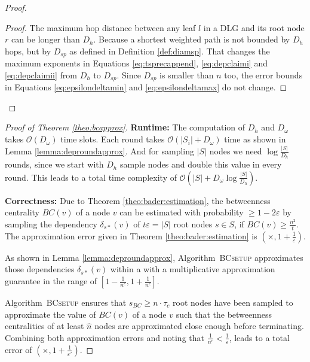 \documentclass[11pt]{article}
\newcommand{\BO}{\mathcal{O}}
\renewcommand{\epsilon}{\varepsilon}
\newif\iffull
\begin{document}
\begin{proof}
\begin{proof}
The maximum hop distance between any leaf $l$ in a DLG and its root node $r$ can be longer than $D_h$. Because a shortest weighted path is not bounded by $D_h$ hops, but by $D_{sp}$ as defined in Definition \ref{def:diamsp}. That changes the maximum exponents in Equations \eqref{eq:tsprecappend}, \eqref{eq:depclaimi} and \eqref{eq:depclaimii} from $D_h$ to $D_{sp}$. Since $D_{sp}$ is smaller than $n$ too, the error bounds in Equations \eqref{eq:epsilondeltamin} and \eqref{eq:epsilondeltamax} do not change.
\end{proof} 








\end{proof}


\begin{proof}[Proof of Theorem \ref{theo:bcapprox}]
\textbf{Runtime: }
The computation of $D_h$ and $D_\omega$ \iffull in Lines \ref{line:BCestimstart} to \ref{line:BCestimend}\fi takes $\BO(D_\omega)$ time slots.
Each round takes $\BO(|S_i|+D_\omega)$ time as shown in Lemma \ref{lemma:deproundapprox}. And for sampling $|S|$ nodes we need $\log\frac{|S|}{D_h}$ rounds, since we start with ${D_h}$ sample nodes and double this value in every round. This leads to a total time complexity of $\BO\left(|S|+D_\omega\log\frac{|S|}{D_h}\right)$.

\textbf{Correctness: }Due to Theorem \ref{theo:bader:estimation}, the betweenness centrality $BC(v)$ of a node $v$ can be estimated with probability $\geq 1-2\epsilon$ by sampling the dependency $\delta_{s*}(v)$ of $t\epsilon=|S|$ root nodes $s\in S$, if $BC(v)\geq\frac{n^2}{t}$.
The approximation error given in Theorem \ref{theo:bader:estimation} is $\left(\times,1+\frac{1}{\epsilon}\right)$.

As shown in Lemma \ref{lemma:deproundapprox}, Algorithm\iffull~\ref{alg:BC_setup_controlling}\fi~\textsc{BCsetup} approximates those dependencies $\delta_{s*}(v)$ within a with a multiplicative approximation guarantee in the range of $[1-\frac{1}{n^c},1+\frac{1}{n^c}]$. 
\iffull In Line \ref{line:BCcheck} and \ref{line:BCnhatcheck}, \fi
Algorithm\iffull~\ref{alg:BC_setup_controlling}\fi~\textsc{BCsetup} ensures that $s_{BC}\ge n\cdot \tau_c$ root nodes have been sampled to approximate the value of $BC(v)$ of a node $v$ such that the betweenness centralities of at least $\hat{n}$ nodes are approximated close enough before terminating.
Combining both approximation errors and noting that $\frac{1}{n^c}<\frac{1}{\epsilon}$, leads to a total error of $\left(\times,1+\frac{1}{\epsilon'}\right)$.
\end{proof}
\end{document}
